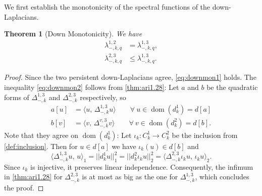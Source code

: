\documentclass[11pt]{article}
\newtheorem{theorem}{Theorem}[section]
\theoremstyle{definition}
\theoremstyle{remark}
\DeclareMathOperator\dom{dom}
\begin{document}
We first establish the monotonicity of the spectral functions of the down-Laplacians.
\begin{theorem}[Down Monotonicity]\label{thm:downmonotonicity}
    We have 
    \begin{align}
        \lambda^{1,2}_{-,k,q}&=\lambda^{1,3}_{-,k,q}, \label{eq:downmon1}\\
        \lambda^{2,3}_{-,k,q}&\le \lambda^{1,3}_{-,k,q}.\label{eq:downmon2}
    \end{align}
\end{theorem}
\begin{proof}
Since the two persistent down-Laplacians agree, \eqref{eq:downmon1} holds. The inequality 
    \eqref{eq:downmon2} follows from \cref{thm:ari1.28}: Let $a$ and $b$ be the quadratic forms of $\Delta_{-,k}^{1,3}$ and $\Delta_{-,k}^{2,3}$ respectively, so
    \begin{align*}
        a[u]&=\langle u,\, \Delta_{-,k}^{1,3} u \rangle \qquad \forall\ u \in \dom(d_k^1)=d[a]\\
        b[v]&=\langle v,\, \Delta_{-,k}^{v,3} v \rangle \qquad \forall\ v \in \dom(d_k^2)=d[b].
    \end{align*}
    Note that they agree on $\dom(d_k^1)$: Let $\iota_k:C_k^1 \rightarrow C_k^2$ be the inclusion from \cref{def:inclusion}. Then for $u \in d[a]$ we have $\iota_k(u) \in d[b]$ and
    $$
        \langle \Delta_{-,k}^{1,3} u,\, u \rangle_1 = ||d_k^1 u||_1^2= ||d_k^2 \iota_k u||_2^2 = \langle \Delta_{-,k}^{2,3} \iota_k u,\, \iota_k u \rangle_2.
    $$
    Since $\iota_k$ is injective, it preserves linear independence.
    Consequently, the infimum in \cref{thm:ari1.28} for $\Delta_{-,k}^{2,3}$ is at most as big as the one for $\Delta_{-,k}^{1,3}$, which concludes the proof.
\end{proof}
\end{document}
